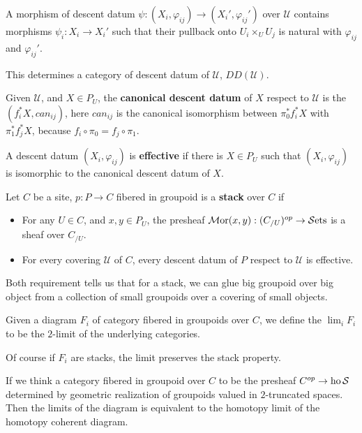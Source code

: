 A morphism of descent datum $\psi: (X_i,\varphi_{ij})\to (X_i',\varphi_{ij}')$ over $\mathcal{U}$ contains morphisms $\psi_i: X_i\to X_i'$ such that their pullback onto $U_i \times _UU_j$ is natural with $\varphi_{ij}$ and $\varphi_{ij}'$. 

This determines a category of descent datum of $\mathcal{U}$, $DD(\mathcal{U})$.

\begin{definition}
    Given $\mathcal{U}$, and $X\in P_U$, the \textbf{canonical descent datum} of $X$ respect to $\mathcal{U}$ is the $(f^*_iX, can_{ij})$, here $can_{ij}$ is the canonical isomorphism between $\pi_0^*f_i^*X$ with $\pi_1^*f_j^*X$, because $f_i\circ \pi_0=f_j\circ \pi_1$.

    A descent datum $(X_i,\varphi_{ij})$ is \textbf{effective} if there is $X\in P_U$ such that $(X_i,\varphi_{ij})$ is isomorphic to the canonical descent datum of $X$.
\end{definition}

\begin{definition}
    Let $C$ be a site, $p:P\to C$ fibered in groupoid is a \textbf{stack} over $C$ if
    \begin{itemize}
        \item For any $U\in C$, and $x,y \in P_U$, the presheaf $\operatorname{\mathcal{M}\mathrm{or}}(x,y):(C_{/U})^{op}\to \operatorname{\mathcal{S}ets}$ is a sheaf over $C_{/U}$.
        \item For every covering $\mathcal{U}$ of $C$, every descent datum of $P$ respect to $\mathcal{U}$ is effective.
    \end{itemize}
\end{definition}

Both requirement tells us that for a stack, we can glue big groupoid over big object from a collection of small groupoids over a covering of small objects.


\begin{definition}
    Given a diagram $F_i$ of category fibered in groupoids over $C$, we define the $\lim_i F_i$ to be the $2$-limit of the underlying categories.
\end{definition}

Of course if $F_i$ are stacks, the limit preserves the stack property.

\begin{remark}
    If we think a category fibered in groupoid over $C$ to be the presheaf $C^{op}\to \mathrm{ho}\operatorname{\mathcal{S}}$ determined by geometric realization of groupoids valued in $2$-truncated spaces. Then the limits of the diagram is equivalent to the homotopy limit of the homotopy coherent diagram.
\end{remark}

